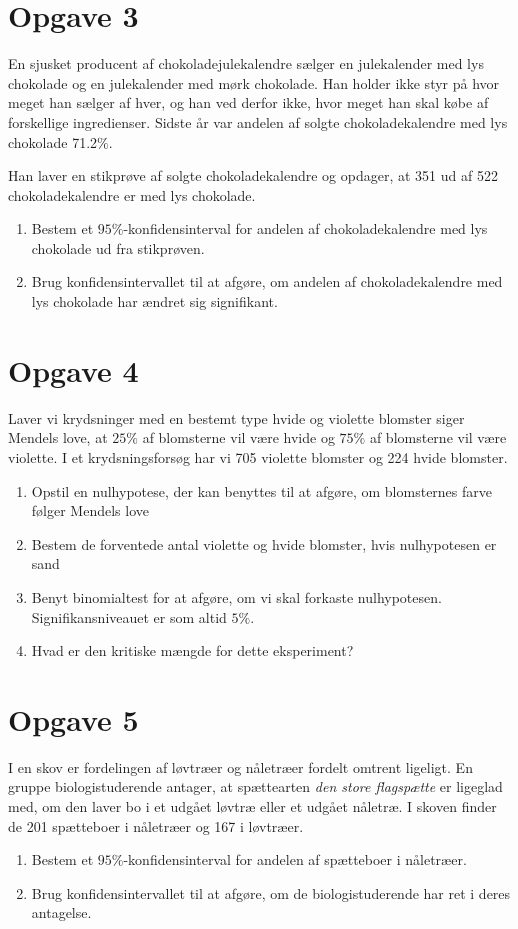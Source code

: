 \section*{Opgave 3}
En sjusket producent af chokoladejulekalendre sælger en julekalender med lys chokolade og en julekalender med mørk chokolade. Han holder ikke styr på hvor meget han sælger af hver, og han ved derfor
ikke, hvor meget han skal købe af forskellige ingredienser. Sidste år var andelen af solgte chokoladekalendre med lys chokolade 71.2$\%$. 

Han laver en stikprøve af solgte chokoladekalendre og opdager, at 351 ud af 522 chokoladekalendre er med lys chokolade.
\begin{enumerate}[label=\roman*)]
	\item Bestem et $95\%$-konfidensinterval for andelen af chokoladekalendre med lys chokolade ud fra stikprøven.
	\item Brug konfidensintervallet til at afgøre, om andelen af chokoladekalendre med lys chokolade har ændret sig signifikant. 
\end{enumerate}


\section*{Opgave 4}
Laver vi krydsninger med en bestemt type hvide og violette blomster siger Mendels love, at $25\%$ af blomsterne vil være hvide og $75\%$ af blomsterne vil være violette. I et krydsningsforsøg har vi 705 violette blomster og 224 hvide blomster. 
\begin{enumerate}[label=\roman*)]
\item Opstil en nulhypotese, der kan benyttes til at afgøre, om blomsternes farve følger Mendels love
\item Bestem de forventede antal violette og hvide blomster, hvis nulhypotesen er sand
\item Benyt binomialtest for at afgøre, om vi skal forkaste nulhypotesen. Signifikansniveauet er som altid $5\%$.
\item Hvad er den kritiske mængde for dette eksperiment?
\end{enumerate}

\section*{Opgave 5}
I en skov er fordelingen af løvtræer og nåletræer fordelt omtrent ligeligt. En gruppe biologistuderende antager, at spættearten \textit{den store flagspætte} er ligeglad med, om den laver bo i et udgået løvtræ eller et udgået nåletræ. I skoven finder de 201 spætteboer i nåletræer og 167 i løvtræer. 
\begin{enumerate}[label=\roman*)]
\item Bestem et $95\%$-konfidensinterval for andelen af spætteboer i nåletræer.
\item Brug konfidensintervallet til at afgøre, om de biologistuderende har ret i deres antagelse.

\end{enumerate}

